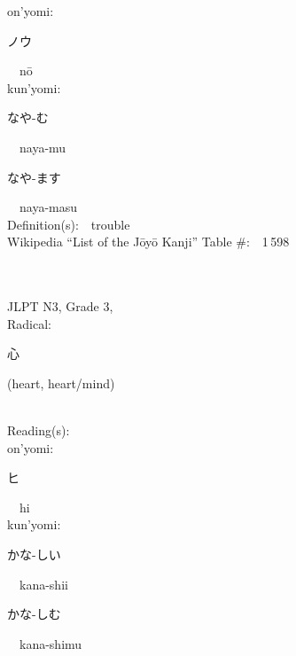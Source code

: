 \begin{multicols}{2}
{\hspace*{1em}}on'yomi:\ \ \\
{\hspace*{2em}}{\begin{CJK}{UTF8}{min} ノウ \end{CJK}}\ \ n\=o\ \ \\
{\hspace*{1em}}kun'yomi:\ \ \\
{\hspace*{2em}}{\begin{CJK}{UTF8}{min} なや-む \end{CJK}}\ \ naya-mu\ \ \\
{\hspace*{2em}}{\begin{CJK}{UTF8}{min} なや-ます \end{CJK}}\ \ naya-masu\ \ \\
Definition(s):\ \ trouble \\
Wikipedia ``List of the J\=oy\=o Kanji'' Table \#:\ \ 1\,598 \\
\ \ \\
{\fontsize{34pt}{40pt}  }\ \ \\  %
{JLPT N3, Grade 3, \\Radical:\ \ {\begin{CJK}{UTF8}{min} 心 \end{CJK}} (heart, heart/mind) } \\
Reading(s):\ \ \\
{\hspace*{1em}}on'yomi:\ \ \\
{\hspace*{2em}}{\begin{CJK}{UTF8}{min} ヒ \end{CJK}}\ \ hi\ \ \\
{\hspace*{1em}}kun'yomi:\ \ \\
{\hspace*{2em}}{\begin{CJK}{UTF8}{min} かな-しい \end{CJK}}\ \ kana-shii\ \ \\
{\hspace*{2em}}{\begin{CJK}{UTF8}{min} かな-しむ \end{CJK}}\ \ kana-shimu\ \ \\

\end{multicols}
